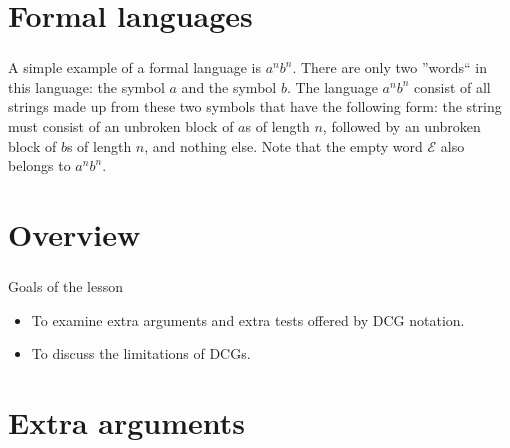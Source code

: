 \section{Formal languages}

\begin{frame}
	\frametitle{\insertsection}
	
	A simple example of a formal language is \(a^nb^n\). There are only two ''words`` in this language: the symbol \(a\) and the symbol \(b\).
	The language \(a^nb^n\) consist of all strings made up from these two symbols that have the following form: the string must consist of an unbroken block of \(a\)s of length \(n\), followed by an unbroken block of \(b\)s of length \(n\), and nothing else. Note that the empty word \(\mathcal{E} \) also belongs to \(a^nb^n \).
	
	
\end{frame}




\section{Overview}

\begin{frame}
	\frametitle{\insertsection}
	Goals of the lesson
	\begin{itemize}
		\item To examine extra arguments and extra tests offered by DCG notation.
		\item To discuss the limitations of DCGs.
	\end{itemize}
\end{frame}


\section{Extra arguments}

